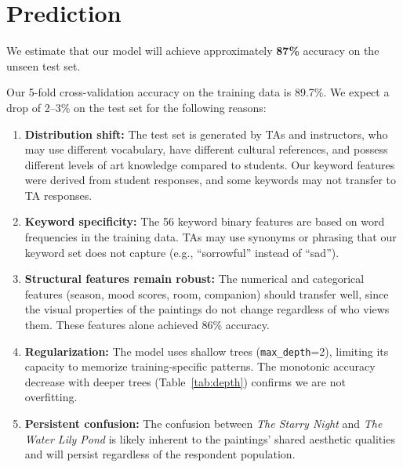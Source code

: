 \documentclass[12pt]{article}
\begin{document}
\section{Prediction}

We estimate that our model will achieve approximately \textbf{87\%} accuracy on the unseen test set.

Our 5-fold cross-validation accuracy on the training data is 89.7\%. We expect a drop of 2--3\% on the test set for the following reasons:

\begin{enumerate}
    \item \textbf{Distribution shift:} The test set is generated by TAs and instructors, who may use different vocabulary, have different cultural references, and possess different levels of art knowledge compared to students. Our keyword features were derived from student responses, and some keywords may not transfer to TA responses.

    \item \textbf{Keyword specificity:} The 56 keyword binary features are based on word frequencies in the training data. TAs may use synonyms or phrasing that our keyword set does not capture (e.g., ``sorrowful'' instead of ``sad'').

    \item \textbf{Structural features remain robust:} The numerical and categorical features (season, mood scores, room, companion) should transfer well, since the visual properties of the paintings do not change regardless of who views them. These features alone achieved 86\% accuracy.

    \item \textbf{Regularization:} The model uses shallow trees (\texttt{max\_depth}=2), limiting its capacity to memorize training-specific patterns. The monotonic accuracy decrease with deeper trees (Table~\ref{tab:depth}) confirms we are not overfitting.

    \item \textbf{Persistent confusion:} The confusion between \textit{The Starry Night} and \textit{The Water Lily Pond} is likely inherent to the paintings' shared aesthetic qualities and will persist regardless of the respondent population.
\end{enumerate}

\end{document}
